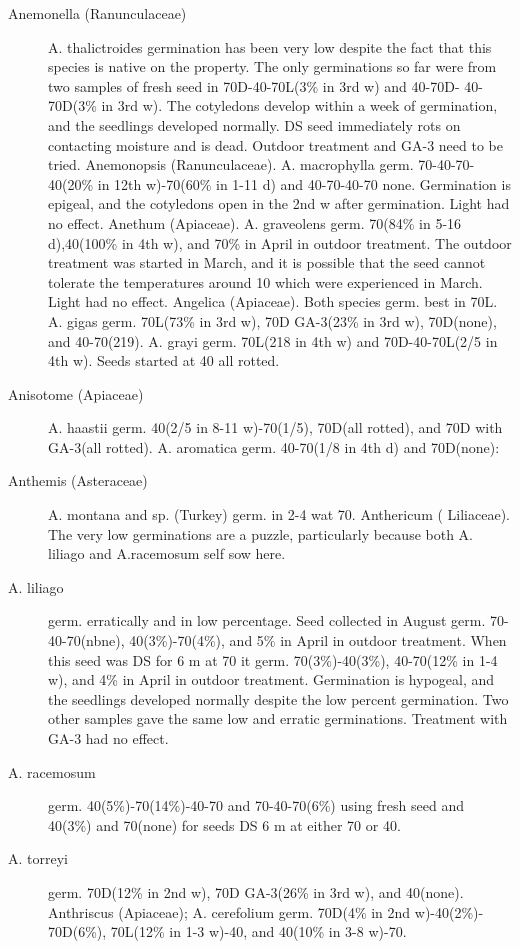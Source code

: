 \begin{description}
\item[Anemonella (Ranunculaceae)] A. thalictroides germination has been very
low despite the fact that this species is native on the property. The only germinations
so far were from two samples of fresh seed in 70D-40-70L(3\% in 3rd w) and 40-70D-
40-70D(3\% in 3rd w). The cotyledons develop within a week of germination, and the
seedlings developed normally. DS seed immediately rots on contacting moisture and
is dead. Outdoor treatment and GA-3 need to be tried.
Anemonopsis (Ranunculaceae). A. macrophylla germ. 70-40-70-40(20\%
in 12th w)-70(60\% in 1-11 d) and 40-70-40-70 none. Germination is epigeal, and the
cotyledons open in the 2nd w after germination. Light had no effect.
Anethum (Apiaceae). A. graveolens germ. 70(84\% in 5-16 d),40(100\% in
4th w), and 70\% in April in outdoor treatment. The outdoor treatment was started in
March, and it is possible that the seed cannot tolerate the temperatures around 10
which were experienced in March. Light had no effect.
Angelica (Apiaceae). Both species germ. best in 70L. A. gigas germ.
70L(73\% in 3rd w), 70D GA-3(23\% in 3rd w), 70D(none), and 40-70(219). A. grayi
germ. 70L(218 in 4th w) and 70D-40-70L(2/5 in 4th w). Seeds started at 40 all rotted.

\item[Anisotome (Apiaceae)] A. haastii germ. 40(2/5 in 8-11 w)-70(1/5), 70D(all
rotted), and 70D with GA-3(all rotted). A. aromatica germ. 40-70(1/8 in 4th d) and
70D(none):

\item[Anthemis (Asteraceae)] A. montana and sp. (Turkey) germ. in 2-4 wat 70.
Anthericum ( Liliaceae). The very low germinations are a puzzle,
particularly because both A. liliago and A.racemosum self sow here.
\item[A. liliago] germ. erratically and in low percentage. Seed collected in August
germ. 70-40-70(nbne), 40(3\%)-70(4\%), and 5\% in April in outdoor treatment. When
this seed was DS for 6 m at 70 it germ. 70(3\%)-40(3\%), 40-70(12\% in 1-4 w), and 4\%
in April in outdoor treatment. Germination is hypogeal, and the seedlings developed
normally despite the low percent germination. Two other samples gave the same low
and erratic germinations. Treatment with GA-3 had no effect.
\item[A. racemosum] germ. 40(5\%)-70(14\%)-40-70 and 70-40-70(6\%) using fresh
seed and 40(3\%) and 70(none) for seeds DS 6 m at either 70 or 40.
\item[A. torreyi] germ. 70D(12\% in 2nd w), 70D GA-3(26\% in 3rd w), and 40(none).
Anthriscus (Apiaceae); A. cerefolium germ. 70D(4\% in 2nd w)-40(2\%)-
70D(6\%), 70L(12\% in 1-3 w)-40, and 40(10\% in 3-8 w)-70.


\end{description}
